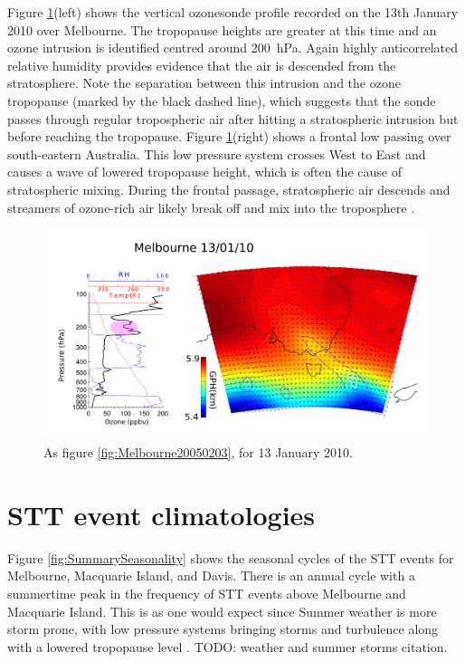 \documentclass{article}
\begin{document}
  Figure \ref{fig:Melbourne20100113}(left) shows the vertical ozonesonde profile recorded on the 13th January 2010 over Melbourne.
  The tropopause heights are greater at this time and an ozone intrusion is identified centred around 200~hPa.
  Again highly anticorrelated relative humidity provides evidence that the air is descended from the stratosphere.
  Note the separation between this intrusion and the ozone tropopause (marked by the black dashed line), which suggests that the sonde passes through regular tropospheric air after hitting a stratospheric intrusion but before reaching the tropopause.
  Figure \ref{fig:Melbourne20100113}(right) shows a frontal low passing over south-eastern Australia.
  This low pressure system crosses West to East and causes a wave of lowered tropopause height, which is often the cause of stratospheric mixing.
  During the frontal passage, stratospheric air descends and streamers of ozone-rich air likely break off and mix into the troposphere \citep{Sprenger2003}.
  
  \begin{figure}[!htbp]
    \begin{center}
    \includegraphics[width=1.0\columnwidth]{figures/Melbourne20100113.png}
    \caption{As figure \ref{fig:Melbourne20050203}, for 13 January 2010.}
    \label{fig:Melbourne20100113}
    \end{center}
  \end{figure}


\section{STT event climatologies}

  Figure \ref{fig:SummarySeasonality} shows the seasonal cycles of the STT events for Melbourne, Macquarie Island, and Davis. 
  There is an annual cycle with a summertime peak in the frequency of STT events above Melbourne and Macquarie Island.
  This is as one would expect since Summer weather is more storm prone, with low pressure systems bringing storms and turbulence along with a lowered tropopause level \citep{Reutter2015}. TODO: weather and summer storms citation.
\end{document}
